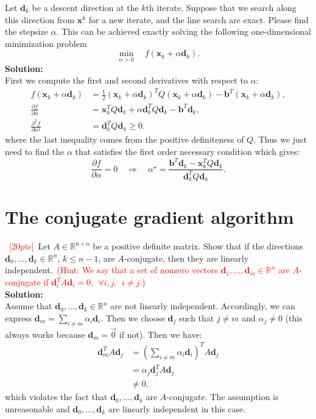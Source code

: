 \documentclass[10pt]{article}
\begin{document}
Let $\bm{d}_{k}$ be a descent direction at the $k$th iterate. Suppose that we search along this direction from $\bm{x}^{k}$ for a new iterate, and the line search are exact. Please find the stepsize $\alpha$. This can be achieved exactly solving the following one-dimensional minimization problem
\begin{equation}
	\min_{\alpha > 0} \quad f(\bm{x}_{k} + \alpha \bm{d}_{k}).
\end{equation}
\textbf{Solution:}\\
First we compute the first and second derivatives with respect to $\alpha$:
\begin{align*}
	f(\bm{x}_{k} + \alpha \bm{d}_{k}) &= \frac{1}{2} (\bm{x}_{k} + \alpha \bm{d}_{k})^TQ(\bm{x}_{k} + \alpha \bm{d}_{k})-\bm{b}^T(\bm{x}_{k} + \alpha \bm{d}_{k}), \\
	\frac{\partial f}{\partial \alpha} &= \bm{x}_k^TQ\bm{d}_k + \alpha \bm{d}_k^TQ \bm{d}_k - \bm{b}^T \bm{d}_k,\\
	\frac{\partial^2 f}{\partial \alpha^2} &= \bm{d}_k^TQ \bm{d}_k \ge 0.
\end{align*}
where the last inequality comes from the positive definiteness of $Q$. Thus we just need to find the $\alpha$ that satisfies the first order necessary condition which gives: 
$$\frac{\partial f}{\partial \alpha}=0 \quad \Rightarrow \quad \alpha^\star = \frac{\bm{b}^T \bm{d}_k-\bm{x}_k^TQ\bm{d}_k}{\bm{d}_k^TQ \bm{d}_k}.$$

\section{The conjugate gradient algorithm}
~\textcolor{red}{[20pts]}~Let $A\in \mathbb{R}^{n\times n}$ be a positive definite matrix. Show that if the directions $\bm{d}_{0}, \ldots, \bm{d}_{k}\in\mathbb{R}^{n}$, $k\leq n-1$,  are $A$-conjugate, then they are linearly independent.~\textcolor{red}{(Hint: We say that a set of nonzero vectors $\bm{d}_1,\ldots,\bm{d}_{m}\in\mathbb{R}^{n}$ are $A$-conjugate if $\bm{d}_{i}^{T}A\bm{d}_{i} = 0,\ \  \forall i,j,~~i\neq j$.)}\\
\textbf{Solution:}\\
Assume that $\bm{d}_{0}, \ldots, \bm{d}_{k}\in\mathbb{R}^{n}$ are not linearly independent. Accordingly, we can express $\bm{d}_m = \sum_{i\ne m}\alpha_i \bm{d}_i$. Then we choose $\bm{d}_j$ such that $j\ne m$ and $\alpha_j \ne 0$ (this always works because $\bm{d}_m = \vec{0}$ if not). Then we have:
	\begin{align*}
		\bm{d}_m^TA\bm{d}_j &= (\sum_{i\ne m}\alpha_i\bm{d}_i )^TA\bm{d}_j\\
		&= \alpha_j \bm{d}_j^TA\bm{d}_j\\
		&\ne 0,
	\end{align*}
which violates the fact that $\bm{d}_{0}, \ldots, \bm{d}_{k}$ are $A$-conjugate. The assumption is unreasonable and $\bm{d}_{0}, \ldots, \bm{d}_{k}$ are linearly independent in this case.
\end{document}
